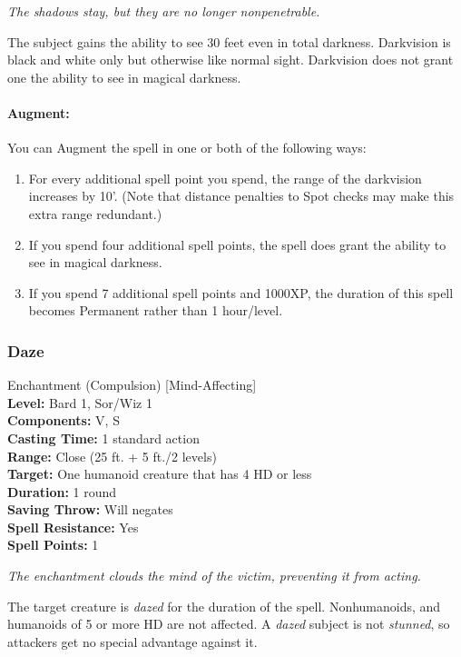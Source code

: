 \emph{The shadows stay, but they are no longer nonpenetrable. }

The subject gains the ability to see 30 feet even in total darkness. 
Darkvision is black and white only but otherwise like normal sight. 
Darkvision does not grant one the ability to see in magical darkness.

\paragraph{Augment:} You can Augment the spell in one or both of the following ways:

\begin{enumerate}
 \item For every additional spell point you spend, the range of the darkvision increases by 10'.
(Note that distance penalties to Spot checks may make this extra range redundant.)
 \item If you spend four additional spell points, the spell does grant the ability to see in magical darkness.
 \item If you spend 7 additional spell points and 1000XP, the duration of this spell
  becomes Permanent rather than 1 hour/level.
\end{enumerate}
\subsubsection{Daze}
\label{Spell:Daze}
Enchantment (Compulsion) [Mind-Affecting]
\\ \textbf{Level:} Bard 1, Sor/Wiz 1
\\ \textbf{Components:} V, S
\\ \textbf{Casting Time:} 1 standard action
\\ \textbf{Range:} Close (25 ft. + 5 ft./2 levels)
\\ \textbf{Target:} One humanoid creature that has 4 HD or less
\\ \textbf{Duration:} 1 round
\\ \textbf{Saving Throw:} Will negates
\\ \textbf{Spell Resistance:} Yes
\\ \textbf{Spell Points:} 1

\emph{The enchantment clouds the mind of the victim, preventing it from acting.}

The target creature is \emph{dazed} for the duration of the spell.
Nonhumanoids, and humanoids of 5 or more HD are not affected. A \emph{dazed} subject is not \emph{stunned}, so attackers get no special advantage against it.

